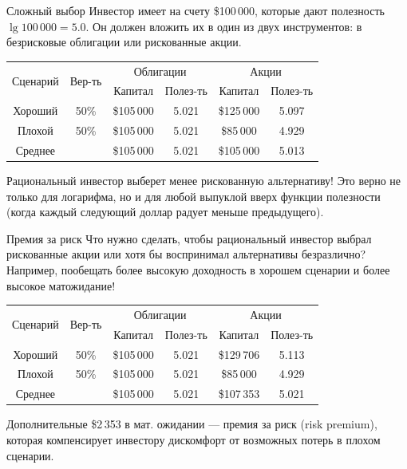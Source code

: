 \documentclass{beamer}
\begin{document}
\begin{frame}{Сложный выбор}
\justify
Инвестор имеет на счету \$100\,000, которые дают полезность
$\lg 100\,000 = 5.0$. Он должен вложить их в один из двух инструментов: в 
безрисковые облигации или рискованные акции.

\justify
\centering
\begin{tabular}{c|c|c|c|c|c}
\multirow{2}{*}{Сценарий} & \multirow{2}{*}{Вер-ть} & \multicolumn{2}{c|}{Облигации} & \multicolumn{2}{c}{Акции} \\
\cline{3-6}
        &      & Капитал    & Полез-ть & Капитал      & Полез-ть \\ \hline
Хороший & 50\% & \$105\,000 & 5.021    & \$125\,000 & 5.097 \\
Плохой  & 50\% & \$105\,000 & 5.021    & \$85\,000  & 4.929 \\ \hline
Среднее &      & \$105\,000 & \alert{5.021} & \$105\,000 & \alert{5.013}
\end{tabular}

\justify
Рациональный инвестор выберет менее рискованную альтернативу! Это верно не 
только для логарифма, но и для любой выпуклой вверх функции полезности (когда 
каждый следующий доллар радует меньше предыдущего).
\end{frame}



\begin{frame}{Премия за риск}
\justify
Что нужно сделать, чтобы рациональный инвестор выбрал рискованные акции или хотя бы воспринимал альтернативы безразлично? Например, пообещать более высокую доходность в хорошем сценарии и более высокое матожидание!

\justify
\centering
\begin{tabular}{c|c|c|c|c|c}
\multirow{2}{*}{Сценарий} & \multirow{2}{*}{Вер-ть} & \multicolumn{2}{c|}{Облигации} & \multicolumn{2}{c}{Акции} \\
\cline{3-6}
        &      & Капитал    & Полез-ть & Капитал      & Полез-ть \\ \hline
Хороший & 50\% & \$105\,000 & 5.021    & \alert{\$129\,706} & \alert{5.113} \\
Плохой  & 50\% & \$105\,000 & 5.021    & \$85\,000  & 4.929 \\ \hline
Среднее &      & \$105\,000 & 5.021    & \alert{\$107\,353} & \alert{5.021}
\end{tabular}

\justify
Дополнительные \$2\,353 в мат. ожидании --- премия за риск (risk premium), 
которая компенсирует инвестору дискомфорт от возможных потерь в плохом 
сценарии.
\end{frame}
\end{document}
